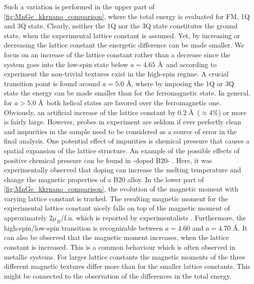 \documentclass [a4paper, 12pt]{article}
\begin{document}
Such a variation is performed in the upper part of \cref{fig:MnGe_kkrnano_comparison}, where
the total energy is evaluated for FM, 1Q and 3Q state.
Clearly, neither the 1Q nor the 3Q state constitutes the ground state,
when the experimental lattice constant is assumed.
Yet, by increasing or decreasing the lattice constant the energetic difference can be made
smaller.
We focus on an increase of the lattice constant rather than a decrease since 
the system goes into the low-spin state below $a=4.65$ \AA \, \cite{rosler_ab_2012} and according to experiment
the non-trivial textures
exist in the high-spin regime.
A crucial transition point is found around $a=5.0$ \AA,
where by imposing the 1Q or 3Q state the energy can be made smaller than for the ferromagnetic state.
In general, for $a>5.0$ \AA \, both helical states are favored over the ferromagnetic one.
Obviously, an artificial increase of the lattice constant by
$0.2$ \AA \, ($\approx 4 \%$) or more is fairly large.
However, probes in experiment are seldom if ever perfectly clean and
impurities in the sample need to be considered as a source of error in the
final analysis. One potential
effect of impurities is chemical pressure that causes a spatial expansion of the
lattice structure.
An example of the possible effects of positive chemical pressure
can be found in -doped B20- \cite{stolt_chemical_2018}. 
Here, it was experimentally observed
that doping can increase the melting temperature and change the magnetic properties of a B20 alloy.
In the lower part of \cref{fig:MnGe_kkrnano_comparison}, the evolution of the magnetic moment
with varying lattice constant is tracked.
The resulting magnetic moment for the experimental lattice constant nicely falls 
on top of the magnetic moment of approximately $2 \mu_{B}$/f.u. 
which is reported by experimentalists \cite{yaouanc_magnetic_2017}.
Furthermore, the high-spin/low-spin transition is recognizable between $a=4.60$ and $a=4.70$ \AA.
It can also be observed that the magnetic moment increases, when the lattice constant is increased.
This is a common behaviour which is often observed in metallic systems.
For larger lattice constants the magnetic moments of the three different
magnetic textures differ more than for the smaller lattice constants.
This might be connected to the observation of the differences in the total energy.
\end{document}
